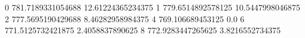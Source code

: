 0 781.7189331054688 12.61224365234375
1 779.6514892578125 10.5447998046875
2 777.5695190429688 8.46282958984375
4 769.106689453125 0.0
6 771.5125732421875 2.4058837890625
8 772.9283447265625 3.8216552734375
